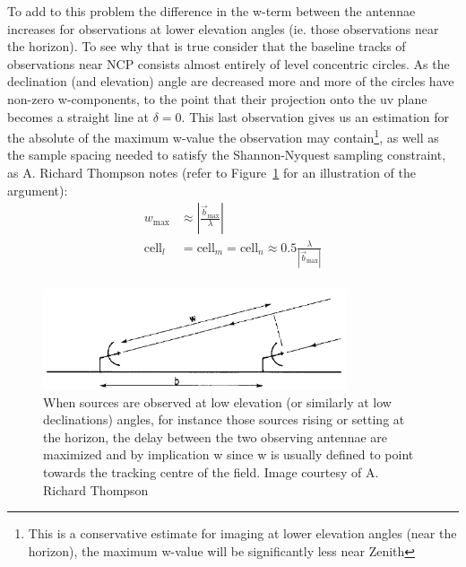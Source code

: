To add to this problem the difference in the w-term between the antennae increases for observations at lower elevation angles (ie. those observations near the horizon). To see why that
is true consider that the baseline tracks of observations near NCP consists almost entirely of level concentric circles. As the declination (and elevation) angle are decreased 
more and more of the circles have non-zero w-components, to the point that their projection onto the uv plane becomes a straight line at $\delta=0$. This last observation
gives us an estimation for the absolute of the maximum w-value the observation may contain\footnote{This is a conservative estimate for imaging at lower elevation angles (near the horizon),
the maximum w-value will be significantly less near Zenith}, as well as the sample spacing needed to satisfy the Shannon-Nyquest sampling constraint, 
as A. Richard Thompson \cite[Lecture 2]{taylor1999synthesis} notes (refer to Figure~\ref{fig_max_baseline} for an illustration of the argument):
\begin{equation}
 \label{eqn_wmax}
 \begin{split}
  w_{\text{max}} &\approx |\frac{\vec{b}_{\text{max}}}{\lambda}|\\
  \text{cell}_l &= \text{cell}_m = \text{cell}_n \approx 0.5\frac{\lambda}{|\vec{b}_{\text{max}}|}\\
 \end{split}
\end{equation}

\begin{figure}[h!]
  \begin{mdframed}
    \centering
    \includegraphics[width=0.8\textwidth]{images/max_w.png}
    \caption[Maximum w-estimation at low azimuth angle observation]{When sources are observed at low elevation (or similarly at low declinations) angles,
    for instance those sources rising or setting at the horizon, the delay between the two observing antennae are maximized and by implication w since w is usually
    defined to point towards the tracking centre of the field. Image courtesy of A. Richard Thompson \cite[Lecture 2]{taylor1999synthesis}}
    \label{fig_max_baseline}
  \end{mdframed}
\end{figure}

